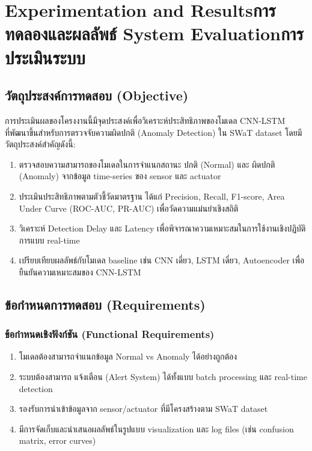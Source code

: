 \chapter{\ifproject%
\ifenglish Experimentation and Results\else การทดลองและผลลัพธ์\fi
\else%
\ifenglish System Evaluation\else การประเมินระบบ\fi
\fi}

\section{วัตถุประสงค์การทดสอบ (Objective)}
\hspace{2em} การประเมินผลของโครงงานนี้มีจุดประสงค์เพื่อวิเคราะห์ประสิทธิภาพของโมเดล CNN-LSTM \\ ที่พัฒนาขึ้นสำหรับการตรวจจับความผิดปกติ (Anomaly Detection) ใน SWaT dataset โดยมีวัตถุประสงค์สำคัญดังนี้:
\begin{enumerate}
    \item ตรวจสอบความสามารถของโมเดลในการจำแนกสถานะ ปกติ (Normal) และ ผิดปกติ (Anomaly) จากข้อมูล time-series ของ sensor และ actuator
    \item ประเมินประสิทธิภาพตามตัวชี้วัดมาตรฐาน ได้แก่ Precision, Recall, F1-score, Area Under Curve (ROC-AUC, PR-AUC) เพื่อวัดความแม่นยำเชิงสถิติ
    \item วิเคราะห์ Detection Delay และ Latency เพื่อพิจารณาความเหมาะสมในการใช้งานเชิงปฏิบัติการแบบ real-time
    \item เปรียบเทียบผลลัพธ์กับโมเดล baseline เช่น CNN เดี่ยว, LSTM เดี่ยว, Autoencoder เพื่อยืนยันความเหมาะสมของ CNN-LSTM
\end{enumerate}

\section{ข้อกำหนดการทดสอบ (Requirements)}
\subsection{ข้อกำหนดเชิงฟังก์ชัน (Functional Requirements)}
\begin{enumerate}
    \item โมเดลต้องสามารถจำแนกข้อมูล Normal vs Anomaly ได้อย่างถูกต้อง
    \item ระบบต้องสามารถ แจ้งเตือน (Alert System) ได้ทั้งแบบ batch processing และ real-time detection
    \item รองรับการนำเข้าข้อมูลจาก sensor/actuator ที่มีโครงสร้างตาม SWaT dataset
    \item มีการจัดเก็บและนำเสนอผลลัพธ์ในรูปแบบ visualization และ log files (เช่น confusion matrix, error curves)
\end{enumerate}

